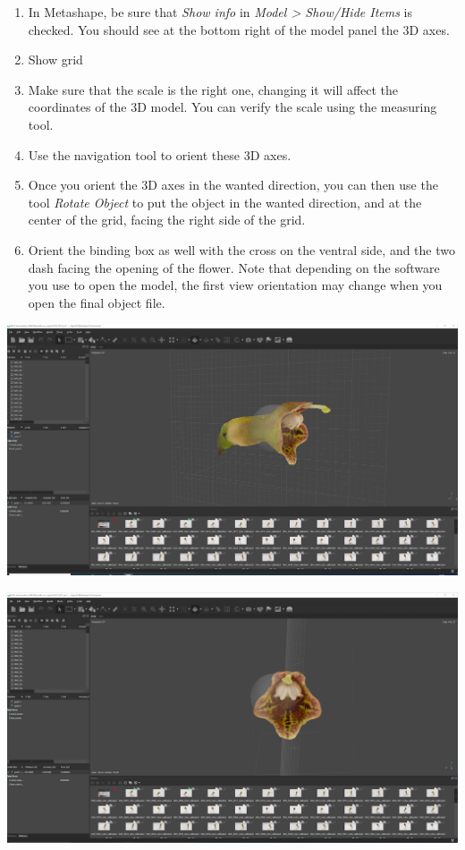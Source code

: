 \documentclass[
]{book}
\theoremstyle{definition}
\theoremstyle{definition}
\theoremstyle{definition}
\theoremstyle{definition}
\theoremstyle{remark}
\begin{document}
\begin{enumerate}
\def\labelenumi{\arabic{enumi}.}
\item
  In Metashape, be sure that \emph{Show info} in \emph{Model \textgreater{} Show/Hide Items}
  is checked. You should see at the bottom right of the model panel
  the 3D axes.
\item
  Show grid
\item
  Make sure that the scale is the right one, changing it will affect
  the coordinates of the 3D model. You can verify the scale using the
  measuring tool.
\item
  Use the navigation tool to orient these 3D axes.
\item
  Once you orient the 3D axes in the wanted direction, you can then
  use the tool \emph{Rotate Object} to put the object in the wanted
  direction, and at the center of the grid, facing the right side of
  the grid.
\item
  Orient the binding box as well with the cross on the ventral side,
  and the two dash facing the opening of the flower. Note that
  depending on the software you use to open the model, the first view
  orientation may change when you open the final object file.
\end{enumerate}

\includegraphics[width=1\textwidth,height=\textheight]{Figures/metashape_orientation.png}

\includegraphics[width=1\textwidth,height=\textheight]{Figures/metashape_orientation_2.png}
\end{document}
